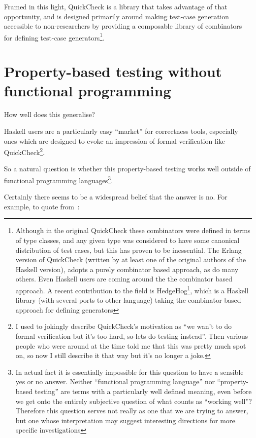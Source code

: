 Framed in this light,
QuickCheck is a library that takes advantage of that opportunity,
and is designed primarily around making test-case generation accessible to non-researchers by providing a composable library of combinators for defining test-case generators\footnote{
Although in the original QuickCheck these combinators were defined in terms of type classes,
and any given type was considered to have some canonical distribution of test cases,
but this has proven to be inessential.
The Erlang version of QuickCheck (written by at least one of the original authors of the Haskell version)\cite{DBLP:conf/erlang/ArtsHJW06},
adopts a purely combinator based approach,
as do many others.
Even Haskell users are coming around the the combinator based approach.
A recent contribution to the field is HedgeHog\footnote{\url{https://github.com/hedgehogqa}},
which is a Haskell library (with several ports to other language) taking the combinator based approach for defining generators}.

\chapter{Property-based testing without functional programming}

How well does this generalise?

Haskell users are a particularly easy ``market'' for correctness tools,
especially ones which are designed to evoke an impression of formal verification like QuickCheck\footnote{
I used to jokingly describe QuickCheck's motivation as ``we wan't to do formal verification but it's too hard, so lets do testing instead''.
Then various people who were around at the time told me that this was pretty much spot on,
so now I still describe it that way but it's no longer a joke.
}.

So a natural question is whether this property-based testing works well outside of functional programming languages\footnote{
In actual fact it is essentially impossible for this question to have a sensible yes or no answer.
Neither ``functional programming language'' nor ``property-based testing'' are terms with a particularly well defined meaning,
even before we get onto the entirely subjective question of what counts as ``working well''?
Therefore this question serves not really as one that we are trying to answer,
but one whose interpretation may suggest interesting directions for more specific investigations
}.

Certainly there seems to be a widespread belief that the answer is no.
For example, to quote from~\cite{matela2017tools}:

